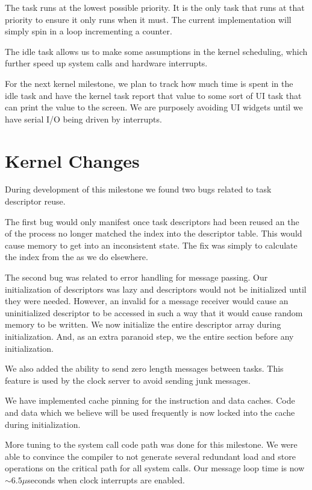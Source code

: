 \documentclass[pdftex,10pt,a4paper]{article}
\begin{document}
The  task runs at the lowest possible priority. It is the
only task that runs at that priority to ensure it only runs when it
must. The current implementation will simply spin in a 
loop incrementing a counter.

The idle task allows us to make some assumptions in the kernel
scheduling, which further speed up system calls and hardware
interrupts.

For the next kernel milestone, we plan to track how much time is spent
in the idle task and have the kernel task report that value to some
sort of UI task that can print the value to the screen. We are
purposely avoiding UI widgets until we have serial I/O being driven by
interrupts.

\section*{Kernel Changes}

During development of this milestone we found two bugs related to task
descriptor reuse.

The first bug would only manifest once task descriptors had been
reused an the  of the process no longer matched the index
into the descriptor table. This would cause memory to get into an
inconsistent state. The fix was simply to calculate the index from the
 as we do elsewhere.

The second bug was related to error handling for message passing. Our
initialization of descriptors was lazy and descriptors would not be
initialized until they were needed. However, an invalid  for
a message receiver would cause an uninitialized descriptor to be
accessed in such a way that it would cause random memory to be
written. We now initialize the entire descriptor array during
initialization. And, as an extra paranoid step, we  the
entire  section before any initialization.

We also added the ability to send zero length messages between
tasks. This feature is used by the clock server to avoid sending junk
messages.

We have implemented cache pinning for the instruction and data
caches. Code and data which we believe will be used frequently is now
locked into the cache during initialization.

More tuning to the system call code path was done for this
milestone. We were able to convince the compiler to not generate
several redundant load and store operations on the critical path for
all system calls. Our message loop time is now $\sim6.5\mu$seconds
when clock interrupts are enabled.
\end{document}
